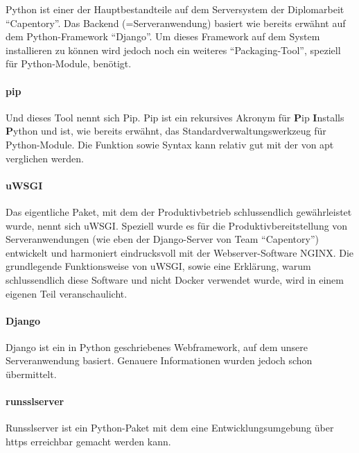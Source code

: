 Python ist einer der Hauptbestandteile auf dem Serversystem der
Diplomarbeit ``Capentory''. Das Backend (=Serveranwendung) basiert wie
bereits erwähnt auf dem Python-Framework ``Django''. Um dieses Framework
auf dem System installieren zu können wird jedoch noch ein weiteres
``Packaging-Tool'', speziell für Python-Module, benötigt.

\hypertarget{pip}{%
\paragraph{pip}\label{pip}}

Und dieses Tool nennt sich Pip. Pip ist ein rekursives Akronym für
\textbf{P}ip \textbf{I}nstalls \textbf{P}ython und ist, wie bereits
erwähnt, das Standardverwaltungswerkzeug für Python-Module. Die Funktion
sowie Syntax kann relativ gut mit der von apt verglichen werden.

\hypertarget{uwsgi}{%
\paragraph{uWSGI}\label{uwsgi}}

Das eigentliche Paket, mit dem der Produktivbetrieb schlussendlich
gewährleistet wurde, nennt sich uWSGI. Speziell wurde es für die
Produktivbereitstellung von Serveranwendungen (wie eben der
Django-Server von Team ``Capentory'') entwickelt und harmoniert
eindrucksvoll mit der Webserver-Software NGINX. Die grundlegende
Funktionsweise von uWSGI, sowie eine Erklärung, warum schlussendlich
diese Software und nicht Docker verwendet wurde, wird in einem eigenen
Teil  veranschaulicht.

\hypertarget{django}{%
\paragraph{Django}\label{django}}

Django ist ein in Python geschriebenes Webframework, auf dem unsere
Serveranwendung basiert. Genauere Informationen wurden jedoch schon
übermittelt. 

\hypertarget{runsslserver}{%
\paragraph{runsslserver}\label{runsslserver}}

Runsslserver ist ein Python-Paket mit dem eine Entwicklungsumgebung über
https erreichbar gemacht werden kann.

